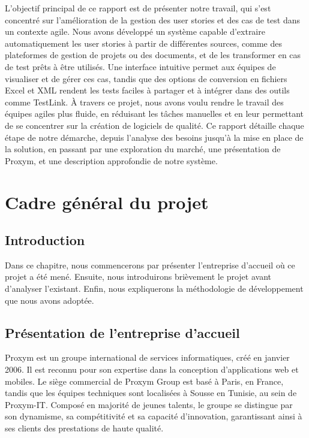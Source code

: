 \documentclass[12pt,a4paper]{report}
\begin{document}
L’objectif principal de ce rapport est de présenter notre travail, qui s’est concentré sur l’amélioration de la gestion des user stories et des cas de test dans un contexte agile. Nous avons développé un système capable d’extraire automatiquement les user stories à partir de différentes sources, comme des plateformes de gestion de projets ou des documents, et de les transformer en cas de test prêts à être utilisés. Une interface intuitive permet aux équipes de visualiser et de gérer ces cas, tandis que des options de conversion en fichiers Excel et XML rendent les tests faciles à partager et à intégrer dans des outils comme TestLink. À travers ce projet, nous avons voulu rendre le travail des équipes agiles plus fluide, en réduisant les tâches manuelles et en leur permettant de se concentrer sur la création de logiciels de qualité. Ce rapport détaille chaque étape de notre démarche, depuis l’analyse des besoins jusqu’à la mise en place de la solution, en passant par une exploration du marché, une présentation de Proxym, et une description approfondie de notre système.

\chapter{Cadre général du projet}
\section{Introduction}
Dans ce chapitre, nous commencerons par présenter l’entreprise d’accueil où ce projet a été mené. Ensuite, nous introduirons brièvement le projet avant d’analyser l’existant. Enfin, nous expliquerons la méthodologie de développement que nous avons adoptée.

\section{Présentation de l’entreprise d’accueil}
Proxym est un groupe international de services informatiques, créé en janvier 2006. Il est reconnu pour son expertise dans la conception d'applications web et mobiles. Le siège commercial de Proxym Group est basé à Paris, en France, tandis que les équipes techniques sont localisées à Sousse en Tunisie, au sein de Proxym-IT. Composé en majorité de jeunes talents, le groupe se distingue par son dynamisme, sa compétitivité et sa capacité d’innovation, garantissant ainsi à ses clients des prestations de haute qualité.
\end{document}
